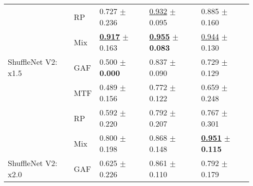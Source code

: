\begin{tabular}[t]{lllll}
 & RP & \textcolor[rgb]{0.4266211604,0.5000000000,0}{0.727} $\pm$ \textcolor[rgb]{0.9474755531,0.0525244469,0}{0.236} & \underline{\textcolor[rgb]{0.0886469673,0.5000000000,0}{0.932}} $\pm$ \textcolor[rgb]{0.0836404647,0.5000000000,0}{0.095} & \textcolor[rgb]{0.2045009785,0.5000000000,0}{0.885} $\pm$ \textcolor[rgb]{0.1862448196,0.5000000000,0}{0.160} \\
 & Mix & \underline{\textbf{\textcolor[rgb]{0.0000000000,0.5000000000,0}{0.917}}} $\pm$ \textcolor[rgb]{0.6538202475,0.3461797525,0}{0.163} & \underline{\textbf{\textcolor[rgb]{0.0000000000,0.5000000000,0}{0.955}}} $\pm$ \textbf{\textcolor[rgb]{0.0000000000,0.5000000000,0}{0.083}} & \underline{\textcolor[rgb]{0.0215264188,0.5000000000,0}{0.944}} $\pm$ \textcolor[rgb]{0.0609939296,0.5000000000,0}{0.130} \\
ShuffleNet V2: x1.5 & GAF & \textcolor[rgb]{0.9385665529,0.0614334471,0}{0.500} $\pm$ \textbf{\textcolor[rgb]{0.0000000000,0.5000000000,0}{0.000}} & \textcolor[rgb]{0.4603421462,0.5000000000,0}{0.837} $\pm$ \textcolor[rgb]{0.0445462134,0.5000000000,0}{0.090} & \textcolor[rgb]{0.6888454012,0.3111545988,0}{0.729} $\pm$ \textcolor[rgb]{0.0568103794,0.5000000000,0}{0.129} \\
 & MTF & \textcolor[rgb]{0.9635949943,0.0364050057,0}{0.489} $\pm$ \textcolor[rgb]{0.6279873475,0.3720126525,0}{0.156} & \textcolor[rgb]{0.7166407465,0.2833592535,0}{0.772} $\pm$ \textcolor[rgb]{0.2659333763,0.5000000000,0}{0.122} & \textcolor[rgb]{0.9060665362,0.0939334638,0}{0.659} $\pm$ \textcolor[rgb]{0.5490881212,0.4509118788,0}{0.248} \\
 & RP & \textcolor[rgb]{0.7320819113,0.2679180887,0}{0.592} $\pm$ \textcolor[rgb]{0.8848167965,0.1151832035,0}{0.220} & \textcolor[rgb]{0.6376360809,0.3623639191,0}{0.792} $\pm$ \textcolor[rgb]{0.8451766078,0.1548233922,0}{0.207} & \textcolor[rgb]{0.5726027397,0.4273972603,0}{0.767} $\pm$ \textcolor[rgb]{0.7659479182,0.2340520818,0}{0.301} \\
 & Mix & \textcolor[rgb]{0.2627986348,0.5000000000,0}{0.800} $\pm$ \textcolor[rgb]{0.7938696415,0.2061303585,0}{0.198} & \textcolor[rgb]{0.3405909798,0.5000000000,0}{0.868} $\pm$ \textcolor[rgb]{0.4439252882,0.5000000000,0}{0.148} & \underline{\textbf{\textcolor[rgb]{0.0000000000,0.5000000000,0}{0.951}}} $\pm$ \textbf{\textcolor[rgb]{0.0000000000,0.5000000000,0}{0.115}} \\
ShuffleNet V2: x2.0 & GAF & \textcolor[rgb]{0.6569965870,0.3430034130,0}{0.625} $\pm$ \textcolor[rgb]{0.9079798901,0.0920201099,0}{0.226} & \textcolor[rgb]{0.3670295490,0.5000000000,0}{0.861} $\pm$ \textcolor[rgb]{0.1853579081,0.5000000000,0}{0.110} & \textcolor[rgb]{0.4951076321,0.5000000000,0}{0.792} $\pm$ \textcolor[rgb]{0.2652475447,0.5000000000,0}{0.179} \\

\end{tabular}
